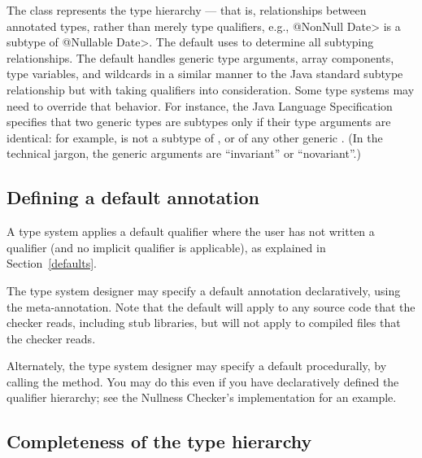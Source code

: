 The  class represents the type hierarchy ---
that is, relationships between
annotated types, rather than merely type qualifiers, e.g., \<@NonNull
Date> is a subtype of \<@Nullable Date>.  The default  uses
 to determine all subtyping relationships.
The default  handles
generic type arguments, array components, type variables, and
wildcards in a similar manner to the Java standard subtype
relationship but with taking qualifiers into consideration.  Some type
systems may need to override that behavior.  For instance, the Java
Language Specification specifies that two generic types are subtypes only
if their type arguments are identical:  for example,
 is not a subtype of , or of any other
generic .
(In the technical jargon, the generic arguments are ``invariant'' or ``novariant''.)


\subsection{Defining a default annotation\label{typesystem-defaults}}

A type system applies a default qualifier where the user has not written a
qualifier (and no implicit qualifier is applicable), as explained in
Section~\ref{defaults}.

The type system designer may specify a default annotation declaratively,
using the 
meta-annotation.
Note that the default will apply to any source code that the checker reads,
including stub libraries, but will not apply to compiled 
files that the checker reads.

\begin{sloppypar}
Alternately, the type system designer may specify a default procedurally,
by calling the
method.  You may do this even if you have declaratively defined the
qualifier hierarchy; see the Nullness Checker's implementation for an
example.
\end{sloppypar}


\subsection{Completeness of the type hierarchy\label{bottom-and-top-qualifier}}

